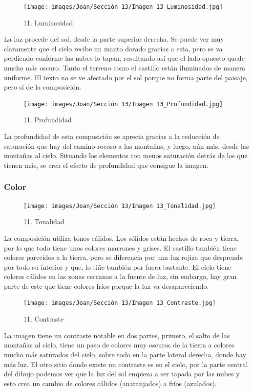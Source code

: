 \documentclass[12pt]{article}
\begin{document}
        \begin{figure}[H]
          \centering
          \texttt{[image: images/Joan/Sección 13/Imagen 13\_Luminosidad.jpg]}
          \caption{\small 11. Luminosidad}
        \end{figure}

        La luz procede del sol, desde la parte superior derecha. Se puede ver muy claramente que el cielo recibe un manto dorado gracias a esta, pero se va perdiendo conforme las nubes lo tapan, resultando así que el lado opuesto quede mucho más oscuro. 
    Tanto el terreno como el castillo están iluminados de manera uniforme. El texto no se ve afectado por el sol porque no forma parte del paisaje, pero sí de la composición. 

    \begin{figure}[H]
          \centering
          \texttt{[image: images/Joan/Sección 13/Imagen 13\_Profundidad.jpg]}
          \caption{\small 11. Profundidad}
        \end{figure}

        La profundidad de esta composición se aprecia gracias a la reducción de saturación que hay del camino rocoso a las montañas, y luego, aún más, desde las montañas al cielo. 
    Situando los elementos con menos saturación detrás de los que tienen más, se crea el efecto de profundidad que consigue la imagen. 

            \subsubsection{Color}
    \begin{figure}[H]
          \centering
          \texttt{[image: images/Joan/Sección 13/Imagen 13\_Tonalidad.jpg]}
          \caption{\small 11. Tonalidad}
        \end{figure}

            La composición utiliza tonos cálidos. Los sólidos están hechos de roca y tierra, por lo que todo tiene unos colores marrones y grises. El castillo también tiene colores parecidos a la tierra, pero se diferencia por una luz rojiza que desprende por todo su interior y que, lo tiñe también por fuera bastante. 
    El cielo tiene colores cálidos en las zonas cercanas a la fuente de luz, sin embargo, hay gran parte de este que tiene colores fríos porque la luz va desapareciendo. 

            \begin{figure}[H]
          \centering
          \texttt{[image: images/Joan/Sección 13/Imagen 13\_Contraste.jpg]}
          \caption{\small 11. Contraste}
        \end{figure}
        La imagen tiene un contraste notable en dos partes, primero, el salto de las montañas al cielo, tiene un paso de colores muy oscuros de la tierra a colores mucho más saturados del cielo, sobre todo en la parte lateral derecha, donde hay más luz. 
    El otro sitio donde existe un contraste es en el cielo, por la parte central del dibujo podemos ver que la luz del sol empieza a ser tapada por las nubes y esto crea un cambio de colores cálidos (anaranjados) a fríos (azulados). 
\end{document}
